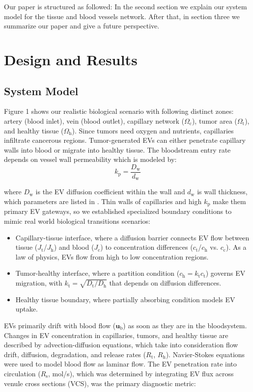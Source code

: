 \documentclass[sigconf]{acmart}
\begin{document}
Our paper is structured as followed: In the second section we explain our system model for the tissue and blood vessels network. After that, in section three we summarize our paper and give a future perspective.

\section{Design and Results}
\label{sec: design-results}

\subsection{System Model}
\label{subsec: sys-model}
Figure 1 shows our realistic biological scenario with following distinct zones: artery (blood inlet), vein (blood outlet), capillary network ($\Omega_{\text{c}}$), tumor area ($\Omega_{\text{t}}$), and healthy tissue ($\Omega_{\text{h}}$). Since tumors need oxygen and nutrients, capillaries infiltrate cancerous regions. Tumor-generated EVs can either penetrate capillary walls into blood or migrate into healthy tissue. The bloodstream entry rate depends on vessel wall permeability which is modeled by:
\begin{equation}
  k_{\mathrm{p}}=\frac{D_{\mathrm{w}}}{d_{\mathrm{w}}}
\end{equation}

where $D_{\mathrm{w}}$ is the EV diffusion coefficient within the wall and $d_{\mathrm{w}}$ is wall thickness, which parameters are listed in \cite{Zoofaghari_2023}. Thin walls of capillaries and high $k_{\mathrm{p}}$ make them primary EV gateways, so we established specialized boundary conditions to mimic real world biological transitions scenarios:
\begin{itemize}
  \item Capillary-tissue interface, where a diffusion barrier connects EV flow between tissue ($J_{\text{t}}$/$J_{\text{h}}$) and blood ($J_{\text{c}}$) to concentration differences ($c_{\text{t}}$/$c_{\text{h}}$ vs. $c_{\text{c}}$). As a law of physics, EVs flow from high to low concentration regions.
  \item Tumor-healthy interface, where a partition condition ($c_{\text{h}} = k_{\text{t}}c_{\text{t}}$) governs EV migration, with $k_{\text{t}} = \sqrt{D_{\text{t}}/D_{\text{h}}}$ that depends on diffusion differences.
  \item Healthy tissue boundary, where partially absorbing condition models EV uptake.
\end{itemize}
EVs primarily drift with blood flow  ($\bm{u}_{\text{b}}$) as soon as they are in the bloodsystem. Changes in EV concentration in capillaries, tumors, and healthy tissue are described by advection-diffusion equations, which take into consideration flow drift, diffusion, degradation, and release rates ($R_{\text{t}}$, $R_{\text{h}}$). Navier-Stokes equations were used to model blood flow as laminar flow. The EV penetration rate into circulation ($R_{\text{s}}$, mol/s), which was determined by integrating EV flux across venule cross sections (VCS), was the primary diagnostic metric:
\end{document}
